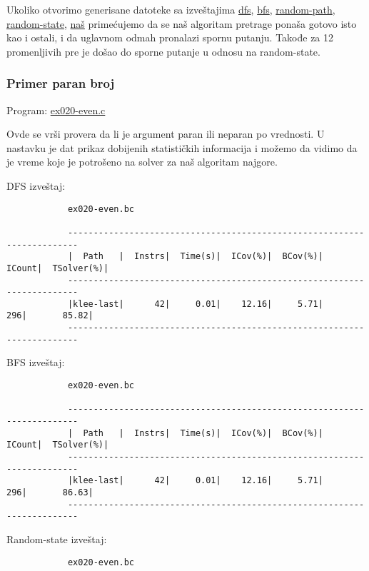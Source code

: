 \documentclass[a4paper]{article}
\begin{document}
{	 	Ukoliko otvorimo generisane datoteke sa izveštajima \href{file:primeri/report_dfs.txt}{dfs}, \href{file:primeri/report_bfs.txt}{bfs}, \href{file:primeri/report_random-path.txt}{random-path},
	 	\href{file:primeri/report_random-state.txt}{random-state},
	 	\href{file:primeri/report_nas.txt}{naš} primećujemo da se naš algoritam pretrage ponaša gotovo isto kao i ostali, i da uglavnom odmah pronalazi spornu putanju. Takođe za 12 promenljivih pre je došao do sporne putanje u odnosu na random-state.  
	 	
	 	
	\subsubsection{Primer paran broj}
	
		Program: \href{file:primeri/ex020-even.c}{ex020-even.c}
		
		Ovde se vrši provera da li je argument paran ili neparan po vrednosti. U nastavku je dat prikaz dobijenih statističkih informacija i možemo da vidimo da je vreme koje je potrošeno na solver za naš algoritam najgore. 
		
		DFS izveštaj:
		
		\begin{verbatim}
			ex020-even.bc
			
			------------------------------------------------------------------------
			|  Path   |  Instrs|  Time(s)|  ICov(%)|  BCov(%)|  ICount|  TSolver(%)|
			------------------------------------------------------------------------
			|klee-last|      42|     0.01|    12.16|     5.71|     296|       85.82|
			------------------------------------------------------------------------
		\end{verbatim}
		
		BFS izveštaj:
		
		\begin{verbatim}
			ex020-even.bc
			
			------------------------------------------------------------------------
			|  Path   |  Instrs|  Time(s)|  ICov(%)|  BCov(%)|  ICount|  TSolver(%)|
			------------------------------------------------------------------------
			|klee-last|      42|     0.01|    12.16|     5.71|     296|       86.63|
			------------------------------------------------------------------------
		\end{verbatim}
		
		Random-state izveštaj:
		
		\begin{verbatim}
			ex020-even.bc
			

\end{verbatim}}
\end{document}
